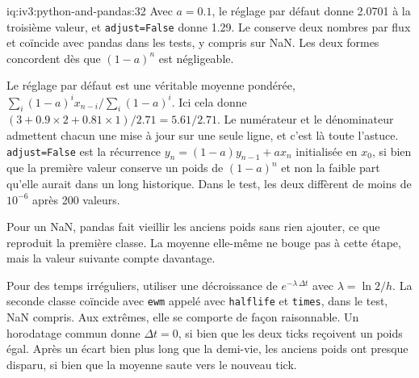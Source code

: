 \begin{solution}{iq:iv3:python-and-pandas:32}
Avec $a = 0.1$, le réglage par défaut donne 2.0701 à la troisième valeur, et \texttt{adjust=False} donne 1.29. Le  conserve deux nombres par flux et coïncide avec pandas dans les tests, y compris sur NaN. Les deux formes concordent dès que $(1 - a)^n$ est négligeable.
\label{lst:iv3:pp:ewma}

Le réglage par défaut est une véritable moyenne pondérée, $\sum_i (1 - a)^i x_{n-i} / \sum_i (1 - a)^i$. Ici cela donne $(3 + 0.9 \times 2 + 0.81 \times 1) / 2.71 = 5.61 / 2.71$. Le numérateur et le dénominateur admettent chacun une mise à jour sur une seule ligne, et c'est là toute l'astuce. \texttt{adjust=False} est la récurrence $y_n = (1 - a) y_{n-1} + a x_n$ initialisée en $x_0$, si bien que la première valeur conserve un poids de $(1 - a)^n$ et non la faible part qu'elle aurait dans un long historique. Dans le test, les deux diffèrent de moins de $10^{-6}$ après 200 valeurs.

Pour un NaN, pandas fait vieillir les anciens poids sans rien ajouter, ce que reproduit la première classe. La moyenne elle-même ne bouge pas à cette étape, mais la valeur suivante compte davantage.

Pour des temps irréguliers, utiliser une décroissance de $e^{-\lambda \, \Delta t}$ avec $\lambda = \ln 2 / h$. La seconde classe coïncide avec \texttt{ewm} appelé avec \texttt{halflife} et \texttt{times}, dans le test, NaN compris. Aux extrêmes, elle se comporte de façon raisonnable. Un horodatage commun donne $\Delta t = 0$, si bien que les deux ticks reçoivent un poids égal. Après un écart bien plus long que la demi-vie, les anciens poids ont presque disparu, si bien que la moyenne saute vers le nouveau tick.

\end{solution}

